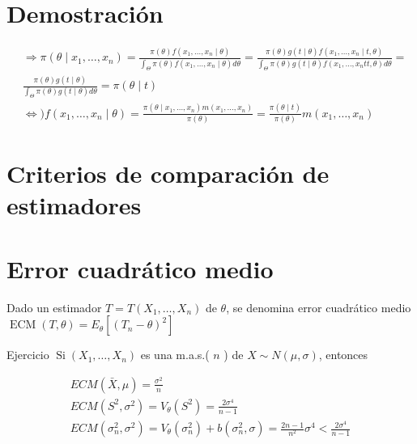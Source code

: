 \section*{Demostración}
$$
  \begin{aligned}
     & \Rightarrow \pi\left(\theta \mid x_{1}, \ldots, x_{n}\right)=\frac{\pi(\theta) f\left(x_{1}, \ldots, x_{n} \mid \theta\right)}{\int_{\Theta} \pi(\theta) f\left(x_{1}, \ldots, x_{n} \mid \theta\right) d \theta}=\frac{\pi(\theta) g(t \mid \theta) f\left(x_{1}, \ldots, x_{n} \mid t, \theta\right)}{\int_{\Theta} \pi(\theta) g(t \mid \theta) f\left(x_{1}, \ldots, x_{n} t t, \theta\right) d \theta}= \\
     & \frac{\pi(\theta) g(t \mid \theta)}{\int_{\Theta} \pi(\theta) g(t \mid \theta) d \theta}=\pi(\theta \mid t)                                                                                                                                                                                                                                                                                                  \\
     & \Leftrightarrow) f\left(x_{1}, \ldots, x_{n} \mid \theta\right)=\frac{\pi\left(\theta \mid x_{1}, \ldots, x_{n}\right) m\left(x_{1}, \ldots, x_{n}\right)}{\pi(\theta)}=\frac{\pi(\theta \mid t)}{\pi(\theta)} m\left(x_{1}, \ldots, x_{n}\right)
  \end{aligned}
$$

\section*{Criterios de comparación de estimadores}
\section*{Error cuadrático medio}
Dado un estimador $T=T\left(X_{1}, \ldots, X_{n}\right)$ de $\theta$, se denomina error cuadrático medio $\operatorname{ECM}(T, \theta)=E_{\theta}\left[\left(T_{n}-\theta\right)^{2}\right]$

Ejercicio $\operatorname{Si}\left(X_{1}, \ldots, X_{n}\right)$ es una m.a.s.( $n$ ) de $X \sim N(\mu, \sigma)$, entonces

$$
  \begin{gathered}
    E C M(\bar{X}, \mu)=\frac{\sigma^{2}}{n} \\
    E C M\left(S^{2}, \sigma^{2}\right)=V_{\theta}\left(S^{2}\right)=\frac{2 \sigma^{4}}{n-1} \\
    E C M\left(\sigma_{n}^{2}, \sigma^{2}\right)=V_{\theta}\left(\sigma_{n}^{2}\right)+b\left(\sigma_{n}^{2}, \sigma\right)=\frac{2 n-1}{n^{2}} \sigma^{4}<\frac{2 \sigma^{4}}{n-1}
  \end{gathered}
$$

